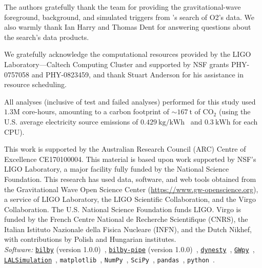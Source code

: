 \documentclass[
 nofootinbib,
 amsmath,amssymb,
 aps,
 twocolumn,
 superscriptaddress
]{revtex4-2}
\newcommand{\code}[1]{{\texttt{#1}}\xspace}
\newcommand{\bilby}{\code{bilby}}
\newcommand{\bilbypipe}{\code{bilby-pipe}}
\newcommand{\dynesty}{\code{dynesty}}
\newcommand{\gwpy}{\code{GWpy}}
\newcommand{\pycbc}{{\sc {{PyCBC}}}\xspace}
\begin{document}
\begin{acknowledgments}
The authors gratefully thank the \pycbc team for providing the gravitational-wave foreground, background, and simulated triggers from \pycbc's search of O2's data. We also warmly thank Ian Harry and Thomas Dent for answering questions about the \pycbc search's data products.  

We gratefully acknowledge the computational resources provided by the LIGO Laboratory—Caltech Computing Cluster and supported by NSF grants PHY-0757058 and PHY-0823459, and thank Stuart Anderson for his assistance in resource scheduling.

All analyses (inclusive of test and failed analyses) performed for this study used ${1.3\mathrm{M}}$ core-hours, amounting to a carbon footprint of ${\sim167\ \mathrm{t}}$ of ${\text{CO}_2}$ (using the U.S. average electricity source emissions of ${0.429\ \text{kg/kWh}}$~\cite{greenhouse} and ${0.3\ \text{kWh}}$ for each CPU).

This work is supported by the Australian Research Council (ARC) Centre of Excellence CE170100004. This material is based upon work supported by NSF’s LIGO Laboratory, a major facility fully funded by the National Science Foundation. This research has used data, software, and web tools obtained from the Gravitational Wave Open Science Center (\href{https://www.gw-openscience.org}{https://www.gw-openscience.org}), a service of LIGO Laboratory, the LIGO Scientific Collaboration, and the Virgo Collaboration. The U.S. National Science Foundation funds LIGO. Virgo is funded by the French Centre National de Recherche Scientifique (CNRS), the Italian Istituto Nazionale della Fisica Nucleare (INFN), and the Dutch Nikhef, with contributions by Polish and Hungarian institutes.\\


\textit{Software:} \href{https://lscsoft.docs.ligo.org/bilby/}{\bilby} (version 1.0.0)~\cite{bilby}, \href{https://lscsoft.docs.ligo.org/bilby_pipe/master/index.html}{\bilbypipe} (version 1.0.0)~\cite{bilby_pipe}, \href{https://dynesty.readthedocs.io/}{\dynesty}~\cite{dynesty, skilling2004, skilling2006}, \href{https://gwpy.github.io/docs/stable/index.html}{\gwpy}~\cite{gwpy}, \href{https://lscsoft.docs.ligo.org/lalsuite/lalsimulation/index.html}{\code{LALSimulation}}~\cite{lalsuite}, \code{matplotlib}~\cite{matplotlib}, \code{NumPy}~\cite{NumPy}, \code{SciPy}~\cite{SciPy}, \code{pandas}~\cite{pandas}, \code{python}~\cite{pythonForScientificComputing,pythonForScientists}. 

\end{acknowledgments}
\end{document}

